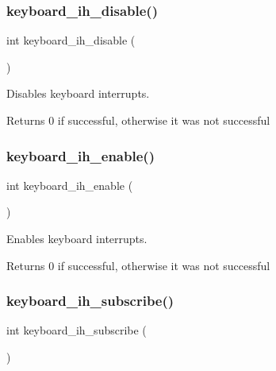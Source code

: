 \subsubsection{\texorpdfstring{keyboard\+\_\+ih\+\_\+disable()}{keyboard\_ih\_disable()}}
{\footnotesize\ttfamily int keyboard\+\_\+ih\+\_\+disable (\begin{DoxyParamCaption}{ }\end{DoxyParamCaption})}



Disables keyboard interrupts. 

\begin{DoxyReturn}{Returns}
0 if successful, otherwise it was not successful 
\end{DoxyReturn}
\mbox{\label{group__keyboard_gad416a0ec7ca419806341ab7be70064b1}} 
\subsubsection{\texorpdfstring{keyboard\+\_\+ih\+\_\+enable()}{keyboard\_ih\_enable()}}
{\footnotesize\ttfamily int keyboard\+\_\+ih\+\_\+enable (\begin{DoxyParamCaption}{ }\end{DoxyParamCaption})}



Enables keyboard interrupts. 

\begin{DoxyReturn}{Returns}
0 if successful, otherwise it was not successful 
\end{DoxyReturn}
\mbox{\label{group__keyboard_ga73e07d998291eb412f8097fd06ddafa8}} 
\subsubsection{\texorpdfstring{keyboard\+\_\+ih\+\_\+subscribe()}{keyboard\_ih\_subscribe()}}
{\footnotesize\ttfamily int keyboard\+\_\+ih\+\_\+subscribe (\begin{DoxyParamCaption}{ }\end{DoxyParamCaption})}



